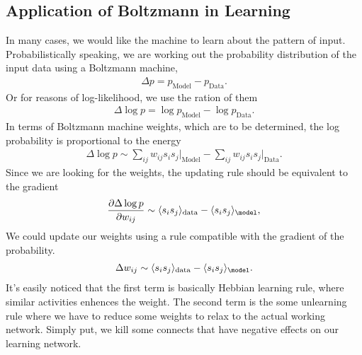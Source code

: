 \documentclass[letterpaper,10pt,english]{sphinxmanual}
\begin{document}
\subsection{Application of Boltzmann in Learning}
\label{\detokenize{machine-intelligence/boltzmann-machine:application-of-boltzmann-in-learning}}
In many cases, we would like the machine to learn about the pattern of input. Probabilistically speaking, we are working out the probability distribution of the input data using a Boltzmann machine,
\begin{equation*}
\begin{split}\Delta p =  p_{\mathrm{Model}} - p_{\mathrm{Data}}.\end{split}
\end{equation*}
Or for reasons of log-likelihood, we use the ration of them
\begin{equation*}
\begin{split}\Delta \log p =   \log p_{\mathrm{Model}} - \log p_{\mathrm{Data}}.\end{split}
\end{equation*}
In terms of Boltzmann machine weights, which are to be determined, the log probability is proportional to the energy
\begin{equation*}
\begin{split}\Delta \log p \sim \sum_{ij} w_{ij} s_i s_j \vert_{\mathrm{Model}}  -    \sum_{ij} w_{ij} s_i s_j \vert_{\mathrm{Data}}.\end{split}
\end{equation*}
Since we are looking for the weights, the updating rule should be equivalent to the gradient
\begin{equation*}
\begin{split}\frac{ \partial \Delta \log p }{ \partial w_{ij} } \sim  \langle s_i s_j\rangle_{\mathrm{data}} - \langle s_i s_j \rangle_{\mathrm{\model}},\end{split}
\end{equation*}
We could update our weights using a rule compatible with the gradient of the probability.
\label{\detokenize{machine-intelligence/boltzmann-machine:equation-eq-weight-update-rule-boltzmann-machine}}\begin{equation}\label{equation:machine-intelligence/boltzmann-machine:eq-weight-update-rule-boltzmann-machine}
\begin{split}\Delta w_{ij} \sim \langle s_i s_j\rangle_{\mathrm{data}} - \langle s_i s_j \rangle_{\mathrm{\model}}.\end{split}
\end{equation}
It’s easily noticed that the first term is basically Hebbian learning rule, where similar activities enhences the weight. The second term is the some unlearning rule where we have to reduce some weights to relax to the actual working network. Simply put, we kill some connects that have negative effects on our learning network.
\end{document}
